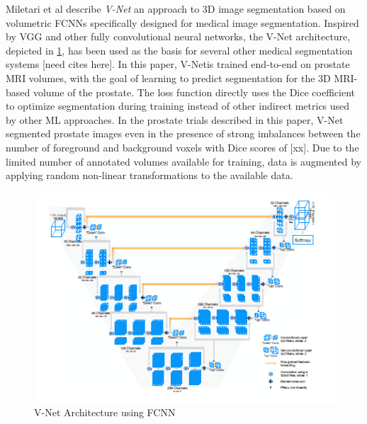 \documentclass[letterpaper, 10 pt, conference]{ieeeconf}  %
\begin{document}
Miletari et al \cite{milletari_vnet} describe \textit{V-Net} an approach to 3D image segmentation based on volumetric FCNNs specifically designed for medical image segmentation. Inspired by VGG and other fully convolutional neural networks, the V-Net architecture, depicted in \ref{fig:miletari}, has been used as the basis for several other medical segmentation systems [need cites here]. In this paper, V-Netis trained end-to-end on prostate MRI volumes, with the goal of learning to predict segmentation for the 3D MRI-based volume of the prostate. The loss function directly uses the Dice coefficient to optimize segmentation during training instead of other indirect metrics used by other ML approaches. In the prostate trials described in this paper, V-Net segmented prostate images even in the presence of strong imbalances between the number of foreground and background voxels with Dice scores of [xx]. Due to the limited number of annotated volumes available for training, data is augmented by applying random non-linear transformations to the available data. 

\begin{figure}
  \includegraphics[width=\linewidth]{images/militari.png}
  \caption{V-Net Architecture using FCNN \cite{milletari_vnet}}
  \label{fig:miletari}
\end{figure}
\end{document}
